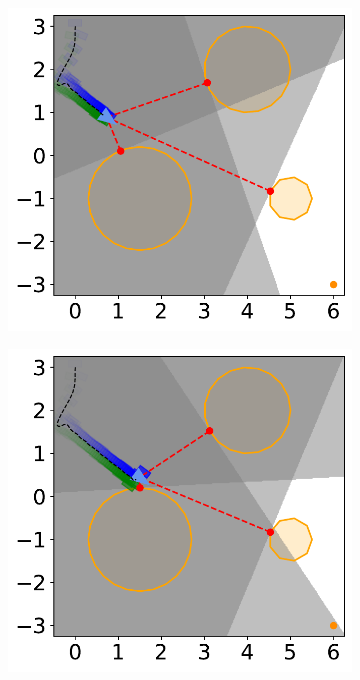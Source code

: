 \begin{figure}[H]
\begin{subfigure}{0.35\textwidth}
    \end{subfigure}%
    \hspace{1em}
    \begin{subfigure}{0.35\textwidth}
        \centering
        \includegraphics[width=\textwidth]{figures/Simulations/sim1circles/frame_2.pdf}
    \end{subfigure}%
    \hspace{1em}
    \begin{subfigure}{0.35\textwidth}
        \centering
        \includegraphics[width=\textwidth]{figures/Simulations/sim1circles/frame_3.pdf}
    \end{subfigure}%


\end{figure}
